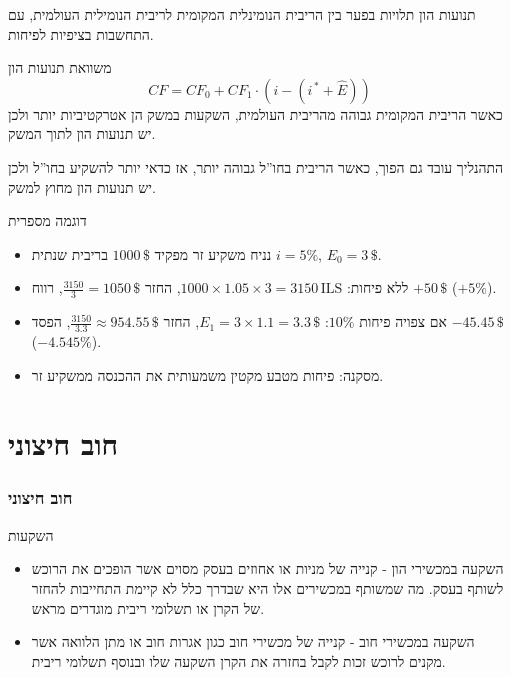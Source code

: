 \documentclass[10pt,usenames,dvipsnames]{beamer}
\newcommand{\heart}{\ensuremath\heartsuit}
\begin{document}
\begin{RTL}
\begin{frame}[allowframebreaks]
    תנועות הון תלויות בפער בין הריבית הנומינלית המקומית לריבית הנומילית העולמית, עם התחשבות בציפיות לפיחות.

    \begin{block}{משוואת תנועות הון}
        $$
        CF = CF_0 + CF_1 \cdot \left(i - \left(i^{\, \ast} + \widehat{E}\right)\right)
        $$
        כאשר הריבית המקומית גבוהה מהריבית העולמית, השקעות במשק הן אטרקטיביות יותר ולכן 
        יש תנועות הון לתוך המשק.
        
        התהנליך עובד גם הפוך, כאשר הריבית בחו''ל גבוהה יותר, אז כדאי יותר להשקיע בחו''ל ולכן יש תנועות הון מחוץ למשק.

    \end{block}
    \framebreak
    
    \begin{exampleblock}{דוגמה מספרית}
    \begin{itemize}
        \item נניח משקיע זר מפקיד \(1000\,\$\) בריבית שנתית \(i=5\%\), \(E_0=3\,\$\).
        \item ללא פיחות: \(1000\times1.05\times3=3150\,\mathrm{ILS}\), החזר \(\frac{3150}{3}=1050\,\$\), רווח \(+50\,\$\) (\(+5\%\)).
        \item אם צפויה פיחות \(10\%\): \(E_1=3\times1.1=3.3\,\$\), החזר \(\frac{3150}{3.3}\approx954.55\,\$\), הפסד \(-45.45\,\$\) (\(-4.545\%\)).
        \item מסקנה: פיחות מטבע מקטין משמעותית את ההכנסה ממשקיע זר.
    \end{itemize}
    \end{exampleblock}
    \end{frame}

\section{חוב חיצוני}
\begin{frame}[allowframebreaks]
    \frametitle{חוב חיצוני}
    \begin{block}{השקעות}
        \begin{itemize}
            \item השקעה במכשירי הון - קנייה של מניות או אחוזים בעסק מסוים אשר הופכים את הרוכש לשותף בעסק.
            מה שמשותף במכשירים אלו היא שבדרך כלל לא קיימת התחייבות להחזר של הקרן או תשלומי ריבית מוגדרים מראש.
            \item השקעה במכשירי חוב - קנייה של מכשירי חוב כגון אגרות חוב או מתן הלוואה אשר מקנים לרוכש זכות לקבל בחזרה את הקרן השקעה שלו ובנוסף תשלומי ריבית.
            \end{itemize}
    \end{block}


\end{frame}
\end{RTL}
\end{document}
